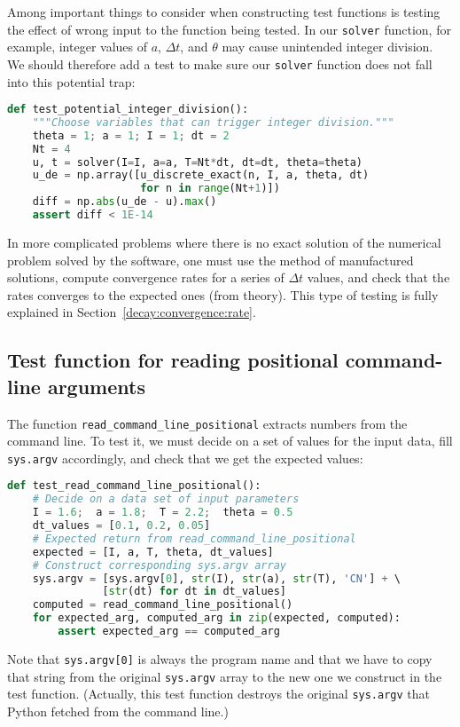 \documentclass[graybox,sectrefs,envcountresetchap,open=right,final]{svmonodo}
\begin{document}
Among important things to consider when constructing test functions
is testing the effect of wrong input to the function being tested.
In our \texttt{solver} function, for example, integer values of $a$, $\Delta t$, and
$\theta$ may cause unintended integer
division. We should therefore add a test to make sure our \texttt{solver}
function does not fall into this potential trap:

\begin{lstlisting}[language=Python,style=blue1_bluegreen]
def test_potential_integer_division():
    """Choose variables that can trigger integer division."""
    theta = 1; a = 1; I = 1; dt = 2
    Nt = 4
    u, t = solver(I=I, a=a, T=Nt*dt, dt=dt, theta=theta)
    u_de = np.array([u_discrete_exact(n, I, a, theta, dt)
                     for n in range(Nt+1)])
    diff = np.abs(u_de - u).max()
    assert diff < 1E-14
\end{lstlisting}

In more complicated problems where there is no exact solution of the
numerical problem solved by the software, one must use the method
of manufactured solutions, compute convergence rates for a series
of $\Delta t$ values, and check that the rates converges to the
expected ones (from theory).
This type of testing is fully explained in
Section~\ref{decay:convergence:rate}.

\subsection{Test function for reading positional command-line arguments}

The function \Verb!read_command_line_positional! extracts numbers from the
command line. To test it, we must decide on a set of values for
the input data, fill \texttt{sys.argv}
accordingly, and check that we get the expected values:

\begin{lstlisting}[language=Python,style=blue1_bluegreen]
def test_read_command_line_positional():
    # Decide on a data set of input parameters
    I = 1.6;  a = 1.8;  T = 2.2;  theta = 0.5
    dt_values = [0.1, 0.2, 0.05]
    # Expected return from read_command_line_positional
    expected = [I, a, T, theta, dt_values]
    # Construct corresponding sys.argv array
    sys.argv = [sys.argv[0], str(I), str(a), str(T), 'CN'] + \ 
               [str(dt) for dt in dt_values]
    computed = read_command_line_positional()
    for expected_arg, computed_arg in zip(expected, computed):
        assert expected_arg == computed_arg
\end{lstlisting}
Note that \texttt{sys.argv[0]} is always the program name and that we have to
copy that string from the original \texttt{sys.argv} array to the new one we
construct in the test function. (Actually, this test function destroys
the original \texttt{sys.argv} that Python fetched from the command line.)
\end{document}
